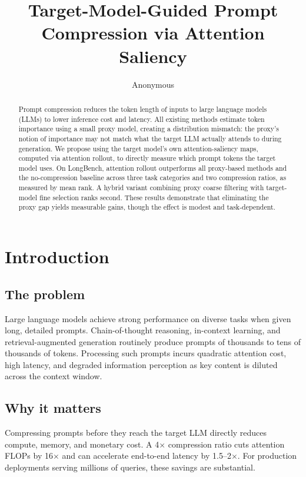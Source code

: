 \documentclass[11pt,letterpaper]{article}
\title{Target-Model-Guided Prompt Compression via Attention Saliency}
\author{Anonymous}
\date{}
\begin{document}
\maketitle

\begin{abstract}
Prompt compression reduces the token length of inputs to large language models (LLMs) to lower inference cost and latency. All existing methods estimate token importance using a small proxy model, creating a distribution mismatch: the proxy's notion of importance may not match what the target LLM actually attends to during generation. We propose using the target model's own attention-saliency maps, computed via attention rollout, to directly measure which prompt tokens the target model uses. On LongBench, attention rollout outperforms all proxy-based methods and the no-compression baseline across three task categories and two compression ratios, as measured by mean rank. A hybrid variant combining proxy coarse filtering with target-model fine selection ranks second. These results demonstrate that eliminating the proxy gap yields measurable gains, though the effect is modest and task-dependent.
\end{abstract}

\section{Introduction}

\subsection{The problem}
Large language models achieve strong performance on diverse tasks when given long, detailed prompts. Chain-of-thought reasoning, in-context learning, and retrieval-augmented generation routinely produce prompts of thousands to tens of thousands of tokens. Processing such prompts incurs quadratic attention cost, high latency, and degraded information perception as key content is diluted across the context window.

\subsection{Why it matters}
Compressing prompts before they reach the target LLM directly reduces compute, memory, and monetary cost. A 4$\times$ compression ratio cuts attention FLOPs by 16$\times$ and can accelerate end-to-end latency by 1.5--2$\times$. For production deployments serving millions of queries, these savings are substantial.
\end{document}
